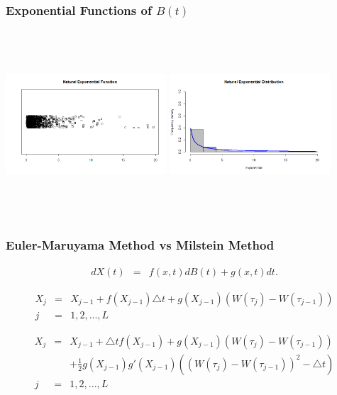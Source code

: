 \documentclass{beamer}   %
\begin{document}
\begin{frame}
    \frametitle{Exponential Functions of $B(t)$}
    \hspace{-5mm}
    \vspace{4mm}
	\includegraphics[height=7cm,width=6cm]{expB_jitter}
	\includegraphics[height=7cm,width=6cm]{expB_hist} 
\end{frame}



\begin{frame}
    \frametitle{Euler-Maruyama Method vs Milstein Method}
    \vspace{-10mm}
  	\begin{eqnarray*}
	dX(t)&=&f(x,t)dB(t)+g(x,t)dt. 
	\end{eqnarray*} 
     \begin{definition}
    \begin{eqnarray*}
		X_{j} &=& X_{j-1} + f(X_{j-1})\triangle t+ g(X_{j-1})(W(\tau_{j})-W(\tau_{j-1}))
		\\ j &=& 1,2,... ,L	
\end{eqnarray*}
\end{definition}
\begin{definition}
	\begin{eqnarray*}
		X_{j} &=& X_{j-1} + \triangle tf(X_{j-1}) + g(X_{j-1})(W(\tau_{j})-W(\tau_{j-1})) 			\nonumber\\ 
		&& + \frac{1}{2} g(X_{j-1})g'(X_{j-1})((W(\tau_{j})-W(\tau_{j-1}))^{2}-\triangle t)
		\\ j &=& 1,2,... ,L
	\end{eqnarray*}
\end{definition}
\end{frame}
\end{document}
